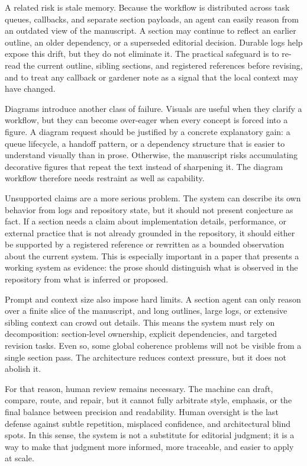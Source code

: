 \documentclass[11pt]{article}
\begin{document}
A related risk is stale memory. Because the workflow is distributed across task queues, callbacks, and separate section payloads, an agent can easily reason from an outdated view of the manuscript. A section may continue to reflect an earlier outline, an older dependency, or a superseded editorial decision. Durable logs help expose this drift, but they do not eliminate it. The practical safeguard is to re-read the current outline, sibling sections, and registered references before revising, and to treat any callback or gardener note as a signal that the local context may have changed.

Diagrams introduce another class of failure. Visuals are useful when they clarify a workflow, but they can become over-eager when every concept is forced into a figure. A diagram request should be justified by a concrete explanatory gain: a queue lifecycle, a handoff pattern, or a dependency structure that is easier to understand visually than in prose. Otherwise, the manuscript risks accumulating decorative figures that repeat the text instead of sharpening it. The diagram workflow therefore needs restraint as well as capability.

Unsupported claims are a more serious problem. The system can describe its own behavior from logs and repository state, but it should not present conjecture as fact. If a section needs a claim about implementation details, performance, or external practice that is not already grounded in the repository, it should either be supported by a registered reference or rewritten as a bounded observation about the current system. This is especially important in a paper that presents a working system as evidence: the prose should distinguish what is observed in the repository from what is inferred or proposed.

Prompt and context size also impose hard limits. A section agent can only reason over a finite slice of the manuscript, and long outlines, large logs, or extensive sibling context can crowd out details. This means the system must rely on decomposition: section-level ownership, explicit dependencies, and targeted revision tasks. Even so, some global coherence problems will not be visible from a single section pass. The architecture reduces context pressure, but it does not abolish it.

For that reason, human review remains necessary. The machine can draft, compare, route, and repair, but it cannot fully arbitrate style, emphasis, or the final balance between precision and readability. Human oversight is the last defense against subtle repetition, misplaced confidence, and architectural blind spots. In this sense, the system is not a substitute for editorial judgment; it is a way to make that judgment more informed, more traceable, and easier to apply at scale.
\end{document}

